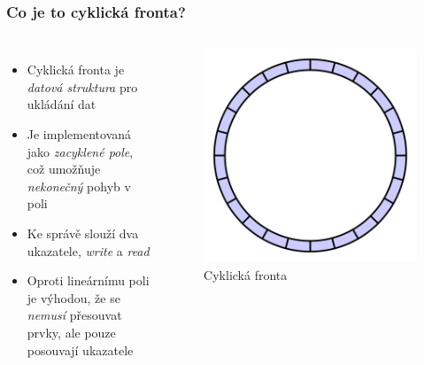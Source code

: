 \documentclass[]{fitthesispresn}
\begin{document}
    \begin{frame}
        \frametitle{Co je to cyklická fronta?}
        \begin{columns}
            \begin{itemize}
                \item Cyklická fronta je \emph{datová struktura} pro ukládání dat
                \item Je implementovaná jako \emph{zacyklené pole}, což umožňuje \emph{nekonečný} pohyb v poli
                \item Ke správě slouží dva ukazatele, \emph{write} a \emph{read}
                \item Oproti lineárnímu poli je výhodou, že se \emph{nemusí} přesouvat prvky, ale pouze posouvají ukazatele
            \end{itemize}
            \begin{figure}[h!]
                \includegraphics[width=\textwidth]{img/circular_buffer_empty_circle.pdf} %
                \caption{Cyklická fronta}
                \label{fig:circular_buffer}
            \end{figure}
        \end{columns}
    \end{frame}
\end{document}
